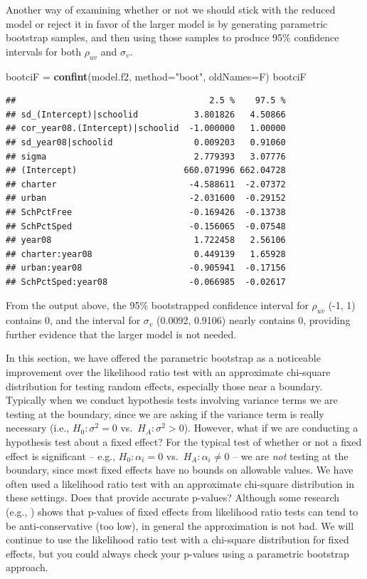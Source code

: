 \documentclass[
]{krantz}
\newenvironment{Shaded}{\begin{snugshade}}{\end{snugshade}}
\newcommand{\DataTypeTok}[1]{\textcolor[rgb]{0.27,0.27,0.27}{#1}}
\newcommand{\KeywordTok}[1]{\textcolor[rgb]{0.27,0.27,0.27}{\textbf{#1}}}
\newcommand{\NormalTok}[1]{#1}
\newcommand{\StringTok}[1]{\textcolor[rgb]{0.5,0.5,0.5}{#1}}
\begin{document}
Another way of examining whether or not we should stick with the reduced model or reject it in favor of the larger model is by generating parametric bootstrap samples, and then using those samples to produce 95\% confidence intervals for both \(\rho_{uv}\) and \(\sigma_{v}\).

\begin{Shaded}
\begin{Highlighting}[]
\NormalTok{bootciF =}\StringTok{ }\KeywordTok{confint}\NormalTok{(model.f2, }\DataTypeTok{method=}\StringTok{"boot"}\NormalTok{, }\DataTypeTok{oldNames=}\NormalTok{F)}
\NormalTok{bootciF}
\end{Highlighting}
\end{Shaded}

\begin{verbatim}
##                                      2.5 %    97.5 %
## sd_(Intercept)|schoolid           3.801826   4.50866
## cor_year08.(Intercept)|schoolid  -1.000000   1.00000
## sd_year08|schoolid                0.009203   0.91060
## sigma                             2.779393   3.07776
## (Intercept)                     660.071996 662.04728
## charter                          -4.588611  -2.07372
## urban                            -2.031600  -0.29152
## SchPctFree                       -0.169426  -0.13738
## SchPctSped                       -0.156065  -0.07548
## year08                            1.722458   2.56106
## charter:year08                    0.449139   1.65928
## urban:year08                     -0.905941  -0.17156
## SchPctSped:year08                -0.066985  -0.02617
\end{verbatim}

From the output above, the 95\% bootstrapped confidence interval for \(\rho_{uv}\) (-1, 1) contains 0, and the interval for \(\sigma_{v}\) (0.0092, 0.9106) nearly contains 0, providing further evidence that the larger model is not needed.

In this section, we have offered the parametric bootstrap as a noticeable improvement over the likelihood ratio test with an approximate chi-square distribution for testing random effects, especially those near a boundary. Typically when we conduct hypothesis tests involving variance terms we are testing at the boundary, since we are asking if the variance term is really necessary (i.e., \(H_0: \sigma^2=0\) vs.~\(H_A: \sigma^2 > 0\)). However, what if we are conducting a hypothesis test about a fixed effect? For the typical test of whether or not a fixed effect is significant -- e.g., \(H_0: \alpha_i=0\) vs.~\(H_A: \alpha_i \neq 0\) -- we are \emph{not} testing at the boundary, since most fixed effects have no bounds on allowable values. We have often used a likelihood ratio test with an approximate chi-square distribution in these settings. Does that provide accurate p-values? Although some research (e.g., \citet{Faraway2005}) shows that p-values of fixed effects from likelihood ratio tests can tend to be anti-conservative (too low), in general the approximation is not bad. We will continue to use the likelihood ratio test with a chi-square distribution for fixed effects, but you could always check your p-values using a parametric bootstrap approach.
\end{document}
